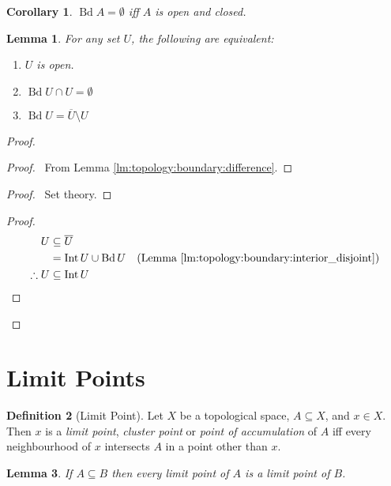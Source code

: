 \documentclass{report}
\let\qed\relax
\newtheorem{lm}{Lemma}[section]
\newtheorem{cor}{Corollary}[lm]
\theoremstyle{definition}
\newtheorem{df}[lm]{Definition}
\newcommand{\Int}{\ensuremath{\operatorname{Int}}}
\newcommand{\Bd}{\ensuremath{\operatorname{Bd}}}
\begin{document}
  \begin{cor}
    $\Bd A = \emptyset$ iff $A$ is open and closed.
  \end{cor}

  \begin{lm}
    For any set $U$, the following are equivalent:
    \begin{enumerate}
      \item $U$ is open.
      \item $\Bd U \cap U = \emptyset$
      \item $\Bd U = \overline{U} \setminus U$
    \end{enumerate}
  \end{lm}

  \begin{proof}
    \pf
    \begin{proof}
      \pf\ From Lemma \ref{lm:topology:boundary:difference}.
    \end{proof}
    \begin{proof}
      \pf\ Set theory.
    \end{proof}
    \begin{proof}
      \pf
      \begin{align*}
        U & \subseteq \overline{U} \\
        & = \Int U \cup \Bd U & (\text{Lemma
          \ref{lm:topology:boundary:interior_disjoint}}) \\
        \therefore U & \subseteq \Int U
      \end{align*}
    \end{proof}
    \qed
  \end{proof}

  \section{Limit Points}

  \begin{df}[Limit Point]
    Let $X$ be a topological space, $A \subseteq X$, and $x \in X$. Then $x$ is
    a
    \emph{limit point}, \emph{cluster point} or \emph{point of accumulation} of
    $A$ iff every neighbourhood of $x$ intersects $A$ in a point other than $x$.
  \end{df}

  \begin{lm}
    \label{lm:topology:limit_point:subset}
    If $A \subseteq B$ then every limit point of $A$ is a limit point of $B$.
  \end{lm}
\end{document}
